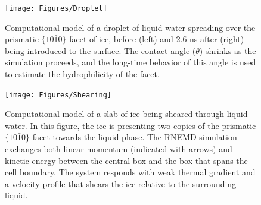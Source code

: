 



\newpage
\begin{figure}
\texttt{[image: Figures/Droplet]}
\caption{\label{fig:Droplet} Computational model of a droplet of
  liquid water spreading over the prismatic $\{10\bar{1}0\}$ facet
  of ice, before (left) and 2.6 ns after (right) being introduced to the
  surface.  The contact angle ($\theta$) shrinks as the simulation
  proceeds, and the long-time behavior of this angle is used to
  estimate the hydrophilicity of the facet.}
\end{figure}
\newpage
\begin{figure}
\texttt{[image: Figures/Shearing]}
\caption{\label{fig:Shearing} Computational model of a slab of ice
  being sheared through liquid water.  In this figure, the ice is
  presenting two copies of the prismatic $\{10\bar{1}0\}$ facet
  towards the liquid phase.  The RNEMD simulation exchanges both
  linear momentum (indicated with arrows) and kinetic energy between
  the central box and the box that spans the cell boundary.  The
  system responds with weak thermal gradient and a velocity profile
  that shears the ice relative to the surrounding liquid.}
\end{figure}

